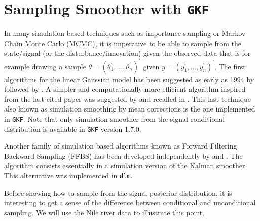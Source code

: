 \documentclass{article}
\newcommand{\GKF}{\texttt{GKF}\xspace}
\begin{document}
\section{Sampling Smoother with \GKF}
\label{sec:SamplingSmoother}

In many simulation based techniques such as importance sampling or Markov Chain Monte Carlo
(MCMC), it is imperative to be able to sample from the state/signal (or the
disturbance/innovation) given the observed data that is for example drawing a sample
$\theta=(\theta_1^\prime,\dots,\theta_n^\prime)^{\prime} $ given
$y=(y_1^\prime,\dots,y_n^\prime)^\prime $. The first algorithms for the linear Gaussian model
has been suggested as early as 1994 by \citet{fruhwirth1994data} followed by
\citet{de1995simulation}. A simpler and computationally more efficient algorithm inspired
from the last cited paper was suggested by \citet{durbin2002simple} and recalled in
\citet[chap. 4.9]{durbin2012time}. This last technique also known as simulation smoothing by
mean corrections is the one implemented in \GKF. Note that only simulation smoother from the
signal conditional distribution is available in \GKF version 1.7.0.

Another family of simulation based algorithms known as Forward Filtering Backward Sampling
(FFBS) has been developed independently by \citet{carter1994gibbs} and
\citet{shephard1994partial}. The algorithm consists essentially in a simulation version of
the Kalman smoother. This alternative was implemented in \texttt{dlm}.

Before showing how to sample from the signal posterior distribution, it is interesting to get
a sense of the difference between conditional and unconditional sampling. We will use the
Nile river data to illustrate this point.
\end{document}
